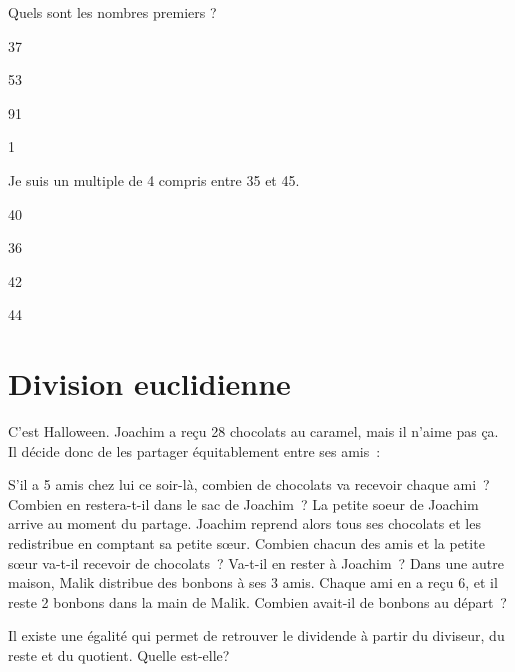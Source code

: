 \documentclass[../math2.tex]{subfiles}
\begin{document}
\begin{tasks}
    \task Quels sont les nombres premiers  ?
    \begin{enumerate}[cols=4, label={\faIcon[regular]{square}}]
        \item 37
        \item 53
        \item 91
        \item 1
    \end{enumerate}

    \task Je suis un multiple de 4 compris entre 35 et 45.
    \begin{enumerate}[cols=4, label={\faIcon[regular]{square}}]
        \item 40
        \item 36
        \item 42
        \item 44
    \end{enumerate}
\end{tasks}

\newpage
\section{Division euclidienne}
\begin{exercise}
    C'est Halloween. Joachim a reçu 28 chocolats au caramel, mais il n'aime pas ça. Il décide donc de les partager équitablement entre ses amis~:

    \begin{tasks}[after-item-skip=4.5cm, after-skip=4.5cm]
        \task S'il a 5 amis chez lui ce soir-là, combien de chocolats va recevoir chaque ami~? \\
        Combien en restera-t-il dans le sac de Joachim~?
        \task La petite soeur de Joachim arrive au moment du partage. Joachim reprend alors tous ses chocolats et les redistribue en comptant sa petite sœur. Combien chacun des amis et la petite sœur va-t-il recevoir de chocolats~? Va-t-il en rester à Joachim~?
        \task Dans une autre maison, Malik distribue des bonbons à ses 3 amis. Chaque ami en a reçu 6, et il reste 2 bonbons dans la main de Malik. Combien avait-il de bonbons au départ~?
    \end{tasks}
\end{exercise}

Il existe une égalité qui permet de retrouver le dividende à partir du diviseur, du reste et du quotient. Quelle est-elle? \\
\end{document}
